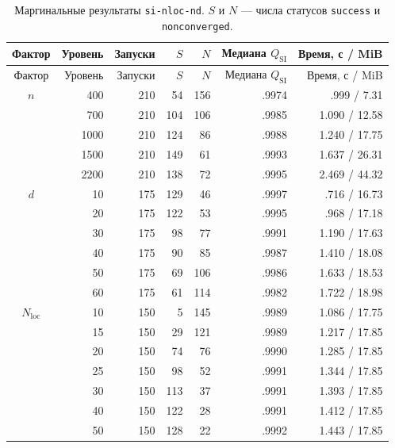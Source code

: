 \documentclass[11pt,a4paper]{article}
\newcommand{\code}[1]{\texttt{#1}}
\newcommand{\qsi}{Q_{\mathrm{SI}}}
\begin{document}
\begin{longtable}{c r r r r r r}
\caption{Маргинальные результаты \code{si-nloc-nd}. $S$ и $N$ --- числа
статусов \code{success} и \code{nonconverged}.}
\label{tab:si-nloc-nd-marginals}\\
\toprule
Фактор & Уровень & Запуски & $S$ & $N$ & Медиана $\qsi$ & Время, с / MiB \\
\midrule
\endfirsthead
\toprule
Фактор & Уровень & Запуски & $S$ & $N$ & Медиана $\qsi$ & Время, с / MiB \\
\midrule
\endhead
$n$ & 400  & 210 & 54  & 156 & .9974 & .999 / 7.31 \\
    & 700  & 210 & 104 & 106 & .9985 & 1.090 / 12.58 \\
    & 1000 & 210 & 124 & 86  & .9988 & 1.240 / 17.75 \\
    & 1500 & 210 & 149 & 61  & .9993 & 1.637 / 26.31 \\
    & 2200 & 210 & 138 & 72  & .9995 & 2.469 / 44.32 \\
\midrule
$d$ & 10 & 175 & 129 & 46  & .9997 & .716 / 16.73 \\
    & 20 & 175 & 122 & 53  & .9995 & .968 / 17.18 \\
    & 30 & 175 & 98  & 77  & .9991 & 1.190 / 17.63 \\
    & 40 & 175 & 90  & 85  & .9987 & 1.410 / 18.08 \\
    & 50 & 175 & 69  & 106 & .9986 & 1.633 / 18.53 \\
    & 60 & 175 & 61  & 114 & .9982 & 1.722 / 18.98 \\
\midrule
$N_{\mathrm{loc}}$ & 10 & 150 & 5   & 145 & .9989 & 1.086 / 17.75 \\
    & 15 & 150 & 29  & 121 & .9989 & 1.217 / 17.85 \\
    & 20 & 150 & 74  & 76  & .9990 & 1.285 / 17.85 \\
    & 25 & 150 & 98  & 52  & .9991 & 1.344 / 17.85 \\
    & 30 & 150 & 113 & 37  & .9991 & 1.393 / 17.85 \\
    & 40 & 150 & 122 & 28  & .9991 & 1.412 / 17.85 \\
    & 50 & 150 & 128 & 22  & .9992 & 1.443 / 17.85 \\
\bottomrule
\end{longtable}
\end{document}
